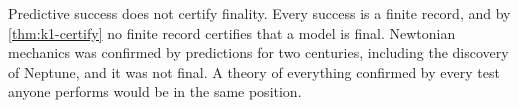 Predictive success does not certify finality. Every success is a finite record, and by
\cref{thm:k1-certify} no finite record certifies that a model is final. Newtonian
mechanics was confirmed by predictions for two centuries, including the discovery of
Neptune, and it was not final. A theory of everything confirmed by every test anyone
performs would be in the same position.
